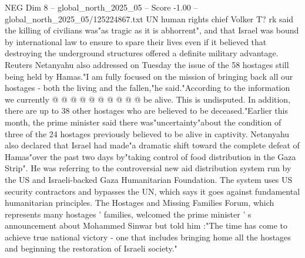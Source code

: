 \begin{textsample}{NEG Dim 8 – global\_north\_2025\_05 – Score -1.00 – global\_north\_2025\_05/125224867.txt}
UN human rights chief Volker T? rk said the killing of civilians was"as tragic as it is abhorrent", and that Israel was bound by international law to ensure to spare their lives even if it believed that destroying the underground structures offered a definite military advantage.
Reuters Netanyahu also addressed on Tuesday the issue of the 58 hostages still being held by Hamas."I am fully focused on the mission of bringing back all our hostages - both the living and the fallen,"he said."According to the information we currently @ @ @ @ @ @ @ @ @ @ be alive.
This is undisputed.
In addition, there are up to 38 other hostages who are believed to be deceased."Earlier this month, the prime minister said there was"uncertainty"about the condition of three of the 24 hostages previously believed to be alive in captivity.
Netanyahu also declared that Israel had made"a dramatic shift toward the complete defeat of Hamas"over the past two days by"taking control of food distribution in the Gaza Strip".
He was referring to the controversial new aid distribution system run by the US and Israeli-backed Gaza Humanitarian Foundation.
The system uses US security contractors and bypasses the UN, which says it goes against fundamental humanitarian principles.
The Hostages and Missing Families Forum, which represents many hostages ' families, welcomed the prime minister ' s announcement about Mohammed Sinwar but told him :"The time has come to achieve true national victory - one that includes bringing home all the hostages and beginning the restoration of Israeli society."

\end{textsample}
